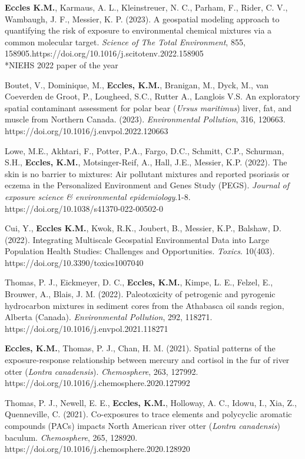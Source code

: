 \documentclass[margin,line]{res}
\begin{document}
\begin{resume}
\textbf{Eccles K.M.}, Karmaus, A. L., Kleinstreuer, N. C., Parham, F., Rider, C. V., Wambaugh, J. F., Messier, K. P. (2023). A geospatial modeling approach to quantifying the risk of exposure to environmental chemical mixtures via a common molecular target. \textit{Science of The Total Environment}, 855, 158905.https://doi.org/10.1016/j.scitotenv.2022.158905\\
\mbox{*}NIEHS 2022 paper of the year\\

\pagebreak

Boutet, V., Dominique, M., \textbf{Eccles, K.M.}, Branigan, M., Dyck, M., van Coeverden de Groot, P., Lougheed, S.C., Rutter A., Langlois V.S. An exploratory spatial contaminant assessment for polar bear (\textit{Ursus maritimus}) liver, fat, and muscle from Northern Canada. (2023). \textit{Environmental Pollution},  316, 120663. https://doi.org/10.1016/j.envpol.2022.120663

Lowe, M.E., Akhtari, F., Potter, P.A., Fargo, D.C., Schmitt, C.P., Schurman, S.H., \textbf{Eccles, K.M.}, Motsinger-Reif, A., Hall, J.E., Messier, K.P. (2022). The skin is no barrier to mixtures: Air pollutant mixtures and reported
psoriasis or eczema in the Personalized Environment and Genes Study (PEGS). \textit{Journal of exposure science \& environmental epidemiology}.1-8. https://doi.org/10.1038/s41370-022-00502-0

Cui, Y., \textbf{Eccles K.M.}, Kwok, R.K., Joubert, B., Messier, K.P., Balshaw, D. (2022). Integrating Multiscale Geospatial Environmental Data into Large Population Health Studies: Challenges and Opportunities. \textit{Toxics}. 10(403). https://doi.org/10.3390/toxics1007040

Thomas, P. J., Eickmeyer, D. C., \textbf{Eccles, K.M.}, Kimpe, L. E., Felzel, E., Brouwer, A., Blais, J. M. (2022). Paleotoxicity of petrogenic and pyrogenic hydrocarbon mixtures in sediment cores from the Athabasca oil sands region, Alberta (Canada). \textit{Environmental Pollution}, 292, 118271. \\
https://doi.org/10.1016/j.envpol.2021.118271

\textbf{Eccles, K.M.}, Thomas, P. J., Chan, H. M. (2021). Spatial patterns of the exposure-response relationship between mercury and cortisol in the fur of river otter (\textit{Lontra canadensis}). \textit{Chemosphere}, 263, 127992. https://doi.org/10.1016/j.chemosphere.2020.127992

Thomas, P. J., Newell, E. E., \textbf{Eccles, K.M.}, Holloway, A. C., Idowu, I., Xia, Z., Quenneville, C. (2021). Co-exposures to trace elements and polycyclic aromatic compounds (PACs) impacts North American river otter (\textit{Lontra canadensis}) baculum. \textit{Chemosphere}, 265, 128920.\\https://doi.org/10.1016/j.chemosphere.2020.128920


\end{resume}
\end{document}
